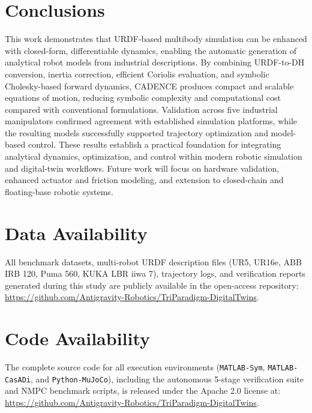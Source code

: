 \documentclass[fleqn,10pt]{article}
\begin{document}
\section*{Conclusions}
	
	This work demonstrates that URDF-based multibody simulation can be enhanced with closed-form, differentiable dynamics, enabling the automatic generation of analytical robot models from industrial descriptions. By combining URDF-to-DH conversion, inertia correction, efficient Coriolis evaluation, and symbolic Cholesky-based forward dynamics, CADENCE produces compact and scalable equations of motion, reducing symbolic complexity and computational cost compared with conventional formulations. Validation across five industrial manipulators confirmed agreement with established simulation platforms, while the resulting models successfully supported trajectory optimization and model-based control. These results establish a practical foundation for integrating analytical dynamics, optimization, and control within modern robotic simulation and digital-twin workflows. Future work will focus on hardware validation, enhanced actuator and friction modeling, and extension to closed-chain and floating-base robotic systems.
	
	\section*{Data Availability}
	All benchmark datasets, multi-robot URDF description files (UR5, UR16e, ABB IRB 120, Puma 560, KUKA LBR iiwa 7), trajectory logs, and verification reports generated during this study are publicly available in the open-access repository: \url{https://github.com/Antigravity-Robotics/TriParadigm-DigitalTwins}.
	
	\section*{Code Availability}
	The complete source code for all execution environments (\texttt{MATLAB-Sym}, \texttt{MATLAB-CasADi}, and \texttt{Python-MuJoCo}), including the autonomous 5-stage verification suite and NMPC benchmark scripts, is released under the Apache 2.0 license at: \url{https://github.com/Antigravity-Robotics/TriParadigm-DigitalTwins}.
	
\end{document}
